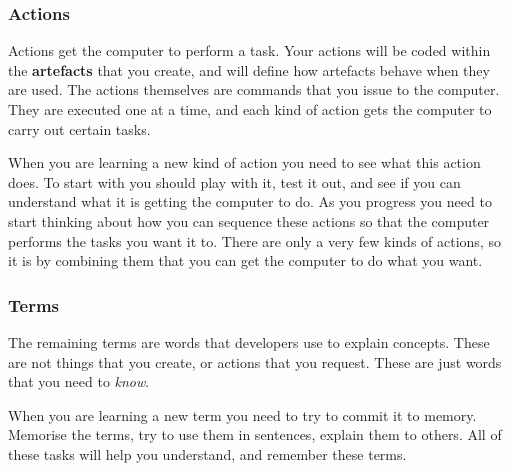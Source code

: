 
\subsubsection{Actions} %
\label{ssub:actions}

Actions get the computer to perform a task. Your actions will be coded within the \textbf{artefacts} that you create, and will define how artefacts behave when they are used. The actions themselves are commands that you issue to the computer. They are executed one at a time, and each kind of action gets the computer to carry out certain tasks.

When you are learning a new kind of action you need to see what this action does. To start with you should play with it, test it out, and see if you can understand what it is getting the computer to do. As you progress you need to start thinking about how you can sequence these actions so that the computer performs the tasks you want it to. There are only a very few kinds of actions, so it is by combining them that you can get the computer to do what you want. 


\subsubsection{Terms} %
\label{ssub:terms}

The remaining terms are words that developers use to explain concepts. These are not things that you create, or actions that you request. These are just words that you need to \emph{know}.

When you are learning a new term you need to try to commit it to memory. Memorise the terms, try to use them in sentences, explain them to others. All of these tasks will help you understand, and remember these terms.


